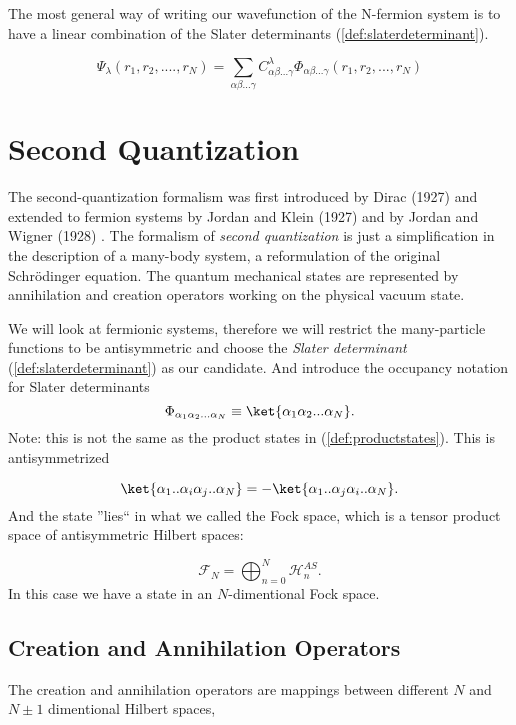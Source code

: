 The most general way of writing our wavefunction of the N-fermion system is to have a linear combination of the Slater determinants (\ref{def:slaterdeterminant}).

\begin{equation}
\Psi_\lambda(r_1,r_2,....,r_N) = \sum_{\alpha\beta...\gamma} C_{\alpha\beta...\gamma}^{\lambda}  \Phi_{\alpha\beta...\gamma}(r_1,r_2,...,r_N)
 \label{def:generalslaterdeterminant}
\end{equation}

\section{Second Quantization}
\label{sec:second quantization}
The second-quantization formalism was first introduced by Dirac (1927) and extended to fermion systems by Jordan and Klein (1927) and by Jordan and Wigner (1928) \cite{bartlett}. The formalism of \emph{second quantization} is just a simplification in the description of a many-body system, a reformulation of the original Schr\"{o}dinger equation. The quantum mechanical states are represented by annihilation and creation operators working on the physical vacuum state. 

We will look at fermionic systems, therefore we will restrict the many-particle functions to be antisymmetric and choose the \emph{Slater determinant} (\ref{def:slaterdeterminant}) as our candidate. And introduce the occupancy notation for Slater determinants
%
\begin{equation}
\Phi_{\alpha_1 \alpha_2...\alpha_N} \equiv \ket{\alpha_1\alpha_2...\alpha_N}.
 \label{def:state}
\end{equation}
%
Note: this is not the same as the product states in (\ref{def:productstates}). This is antisymmetrized 

\begin{equation}
\ket{\alpha_1..\alpha_i\alpha_j..\alpha_N} = -\ket{\alpha_1..\alpha_j\alpha_i..\alpha_N}.
 \label{def:antisymmetricstate}
\end{equation}
%
And the state ''lies`` in what we called the Fock space,  which is a tensor product space of antisymmetric Hilbert spaces:

\begin{equation}
\mathcal{F}_N = \bigoplus_{n=0}^N \mathcal{H}_n^{AS}.
 \label{def:fockspace}
\end{equation}
%
In this case we have a state in an $N$-dimentional Fock space. 

\subsection{Creation and Annihilation Operators}
The creation and annihilation operators are mappings between different $N$ and $N\pm1$ dimentional Hilbert spaces,

